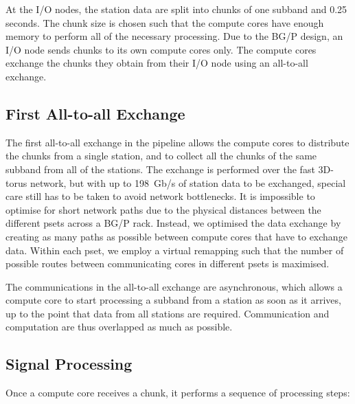 \documentclass{llncs}
\begin{document}
At the I/O nodes, the station data are split into chunks of one subband and 0.25 seconds. The chunk size is chosen such that the compute cores have enough memory to perform all of the necessary processing. Due to the BG/P design, an I/O node sends chunks to its own compute cores only. The compute cores exchange the chunks they obtain from their I/O node using an all-to-all exchange. 

\subsection{First All-to-all Exchange}

The first all-to-all exchange in the pipeline allows the compute cores to distribute the chunks from a single station, and to collect all the chunks of the same subband from all of the stations. The exchange is performed over the fast 3D-torus network, but with up to 198~Gb/s of station data to be exchanged, special care still has to be taken to avoid network bottlenecks. It is impossible to optimise for short network paths due to the physical distances between the different psets across a BG/P rack. Instead, we optimised the data exchange by creating as many paths as possible between compute cores that have to exchange data. Within each pset, we employ a virtual remapping such that the number of possible routes between communicating cores in different psets is maximised.

The communications in the all-to-all exchange are asynchronous, which allows a compute core to start processing a subband from a station as soon as it arrives, up to the point that data from all stations are required. Communication and computation are thus overlapped as much as possible.

\subsection{Signal Processing}

Once a compute core receives a chunk, it performs a sequence of processing steps:
\end{document}
